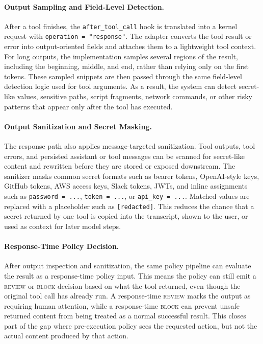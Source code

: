 \documentclass{article}
\begin{document}
\paragraph{Output Sampling and Field-Level Detection.}
After a tool finishes, the \texttt{after\_tool\_call} hook is translated into a
kernel request with \texttt{operation = "response"}. The adapter converts the
tool result or error into output-oriented fields and attaches them to a lightweight
tool context. For long outputs, the implementation samples several regions of the
result, including the beginning, middle, and end, rather than relying only on the
first tokens. These sampled snippets are then passed through the same field-level
detection logic used for tool arguments. As a result, the system can detect
secret-like values, sensitive paths, script fragments, network commands, or other
risky patterns that appear only after the tool has executed.

\paragraph{Output Sanitization and Secret Masking.}
The response path also applies message-targeted sanitization. Tool outputs,
tool errors, and persisted assistant or tool messages can be scanned for
secret-like content and rewritten before they are stored or exposed downstream.
The sanitizer masks common secret formats such as bearer tokens, OpenAI-style
keys, GitHub tokens, AWS access keys, Slack tokens, JWTs, and inline assignments
such as \texttt{password = ...}, \texttt{token = ...}, or
\texttt{api\_key = ...}. Matched values are replaced with a placeholder such as
\texttt{[redacted]}. This reduces the chance that a secret returned by one tool
is copied into the transcript, shown to the user, or used as context for later
model steps.

\paragraph{Response-Time Policy Decision.}
After output inspection and sanitization, the same policy pipeline can evaluate
the result as a response-time policy input. This means the policy can still emit
a \textsc{review} or \textsc{block} decision based on what the tool returned,
even though the original tool call has already run. A response-time
\textsc{review} marks the output as requiring human attention, while a
response-time \textsc{block} can prevent unsafe returned content from being
treated as a normal successful result. This closes part of the gap where
pre-execution policy sees the requested action, but not the actual content
produced by that action.
\end{document}
